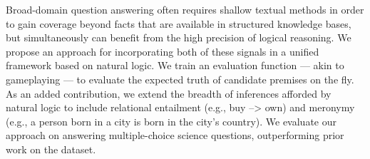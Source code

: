 Broad-domain question answering often requires shallow textual methods in order to gain coverage beyond facts that are available in structured knowledge bases, but simultaneously can benefit from the high precision of logical reasoning. We propose an approach for incorporating both of these signals in a unified framework based on natural logic. We train an evaluation function --- akin to gameplaying --- to evaluate the expected truth of candidate premises on the fly. As an added contribution, we extend the breadth of inferences afforded by natural logic to include relational entailment (e.g., buy --> own) and meronymy (e.g., a person born in a city is born in the city's country). We evaluate our approach on answering multiple-choice science questions, outperforming prior work on the dataset.
